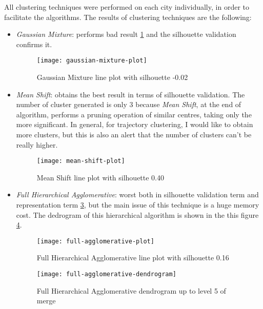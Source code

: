 All clustering techniques were performed on each city individually, in order to facilitate the algorithms. The results of clustering techniques are the following: 

\begin{itemize}
	\item \textit{Gaussian Mixture}: performs bad result \ref{fig:gaussian-mixture-line} and the silhouette validation confirms it.
	
	\begin{figure}[bt]
		\centering
		\texttt{[image: gaussian-mixture-plot]}
		\caption{Gaussian Mixture line plot with silhouette -0.02}
		\label{fig:gaussian-mixture-line}
	\end{figure}

	\item \textit{Mean Shift}: obtains the best result in terms of silhouette validation. The number of cluster generated is only 3 because \textit{Mean Shift}, at the end of algorithm, performs a pruning operation of similar centres, taking only the more significant. In general, for trajectory clustering, I would like to obtain more clusters, but this is also an alert that the number of clusters can't be really higher. 
	
	\begin{figure}[bt]
		\centering
		\texttt{[image: mean-shift-plot]}
		\caption{Mean Shift line plot with silhouette 0.40}
		\label{fig:mean-shift-line}
	\end{figure}

	\item \textit{Full Hierarchical Agglomerative}: worst both in silhouette validation term and representation term \ref{fig:full-agglomerative-line}, but the main issue of this technique is a huge memory cost. The dedrogram of this hierarchical algorithm is shown in the this figure \ref{fig:full-agglomerative-dendrogram}. 
	
	\begin{figure}[bt]
		\centering
		\texttt{[image: full-agglomerative-plot]}
		\caption{Full Hierarchical Agglomerative line plot with silhouette 0.16}
		\label{fig:full-agglomerative-line}
	\end{figure}

	\begin{figure}[bt]
		\centering
		\texttt{[image: full-agglomerative-dendrogram]}
		\caption{Full Hierarchical Agglomerative dendrogram up to level 5 of merge}
		\label{fig:full-agglomerative-dendrogram}
	\end{figure}


\end{itemize}
